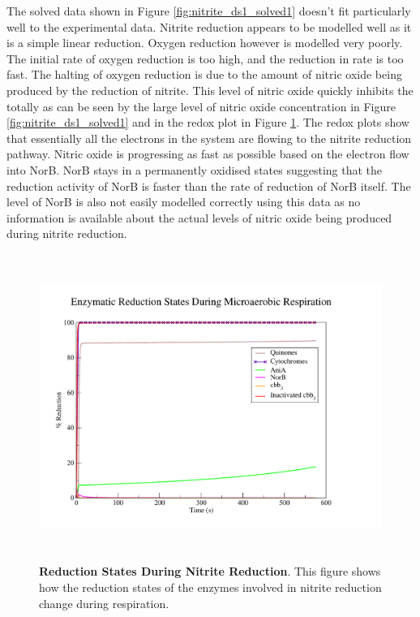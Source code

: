 The solved data shown in Figure \ref{fig:nitrite_ds1_solved1} doesn't fit particularly well to the experimental data. Nitrite reduction appears to be modelled well as it is a simple linear reduction. Oxygen reduction however is modelled very poorly. The initial rate of oxygen reduction is too high, and the reduction in rate is too fast. The halting of oxygen reduction is due to the amount of nitric oxide being produced by the reduction of nitrite. This level of nitric oxide quickly inhibits the \cbbthree{} totally as can be seen by the large level of nitric oxide concentration in Figure \ref{fig:nitrite_ds1_solved1} and in the redox plot in Figure \ref{fig:nitrite_ds1_redox1}. The redox plots show that essentially all the electrons in the system are flowing to the nitrite reduction pathway. Nitric oxide is progressing as fast as possible based on the electron flow into NorB. NorB stays in a permanently oxidised states suggesting that the reduction activity of NorB is faster than the rate of reduction of NorB itself. The level of NorB is also not easily modelled correctly using this data as no information is available about the actual levels of nitric oxide being produced during nitrite reduction.

\begin{figure}[tbp]
 \centering
 \includegraphics[height=10cm, trim=1cm 1cm 3cm 1cm, clip=true]{./07-nitritereduction/data/dataset1redox-1.pdf}
 \caption[Reduction States During Nitrite Reduction]{{\bf Reduction States During Nitrite Reduction}. This figure shows how the reduction states of the enzymes involved in nitrite reduction change during respiration.
  \label{fig:nitrite_ds1_redox1}}
\end{figure}

